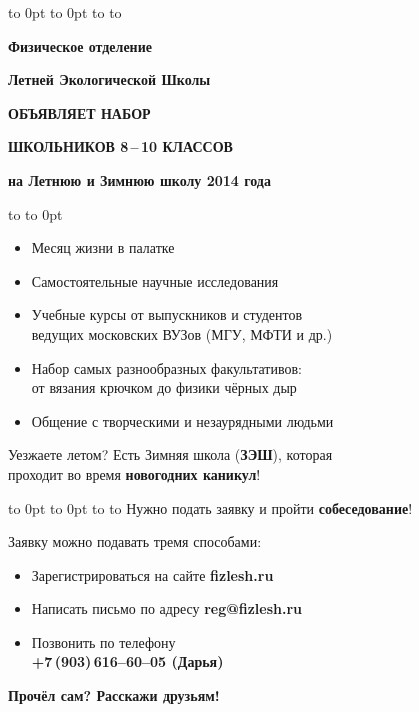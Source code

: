 \documentclass[a5paper,12pt]{article}
\begin{document}
\vbox to 0pt{%
\vbox to 0pt{\vskip1pt
\hbox to \vss}%
}%
\vskip14pt
\hbox to 
\vskip28pt
\centerline{\large\textbf{Физическое отделение}}
\vskip6pt
\centerline{\large\textbf{Летней Экологической Школы}}
\vskip9pt
\centerline{\Large\textsf{\textbf{ОБЪЯВЛЯЕТ НАБОР}}}
\vskip 9pt
\centerline{\Large\textsf{\textbf{ШКОЛЬНИКОВ 8\,--\,10 КЛАССОВ}}}
\vskip 6pt
\centerline{\large\textbf{на Летнюю и Зимнюю школу 2014 года}}
\vskip12pt
\hbox to 
\vskip-24pt\hbox to 0pt{}

{\large%
\begin{itemize}
\setlength{\itemsep}{-4pt}
\setlength{\parindent}{0pt}
\item Месяц жизни в палатке
\item Самостоятельные научные исследования
\item Учебные курсы от выпускников и студентов\\ведущих московских ВУЗов (МГУ, МФТИ и др.)
\item Набор самых разнообразных факультативов:\\от вязания крючком до физики чёрных дыр
\item Общение с творческими и незаурядными людьми
\end{itemize}

Уезжаете летом? Есть Зимняя школа (\textbf{ЗЭШ}), которая\\
проходит во время \textbf{новогодних каникул}!
\vskip-10pt

\vbox to 0pt{%
\vbox to 0pt{%
\vskip27mm
\hbox to \vss}%
}%
\vskip1pt
\hbox to 
\vskip1pt
Нужно подать заявку и пройти \textbf{собеседование}!\par
Заявку можно подавать тремя способами:
\begin{itemize}
\setlength{\itemsep}{-4pt}
\item Зарегистрироваться на сайте \textbf{fizlesh.ru}
\item Написать письмо по адресу \textbf{reg@fizlesh.ru}
\item Позвонить по телефону\\
\textbf{+7\,(903)\,616--60--05 (Дарья)}
\end{itemize}

\textsf{\textbf{Прочёл сам? Расскажи друзьям!}}
}%
\end{document}
